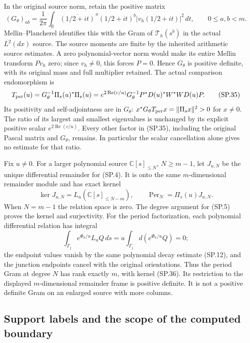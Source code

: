 In the original source norm, retain the positive matrix
\[
 (G_\theta)_{ab}
 =\frac1{2\pi}\int_{\mathbb R}
   \overline{(1/2+it)}^{\,a}(1/2+it)^b
   |v_h(1/2+it)|^2\,dt,\qquad 0\le a,b<m .
 \tag{SP.34}\label{CFStage:eq:sp-sourcegram}
\]
Mellin--Plancherel identifies this with the Gram of
\(\mathcal T_h(s^b)\) in the actual \(L^2(dx)\) source.
The source moments are finite by the inherited arithmetic
source estimates. A zero polynomial-vector norm would
make its entire Mellin transform \(Pv_h\) zero; since
\(v_h\ne0\), this forces \(P=0\).
Hence \(G_\theta\) is positive definite, with its original
mass and full multiplier retained.
The actual comparison endomorphism is
\[
 T_{\rm per}(u)=G_\theta^{-1}\Pi_s(u)^*\Pi_s(u)
 =e^{2\operatorname{Re}(c/u)}
     G_\theta^{-1}P^*D(u)^*W^*WD(u)P .
 \tag{SP.35}\label{CFStage:eq:sp-metriccomparison}
\]
Its positivity and self-adjointness are in \(G_\theta\):
\(x^*G_\theta T_{\rm per}x=\|\Pi_sx\|^2>0\) for \(x\ne0\).
The ratio of its largest and smallest eigenvalues is unchanged
by its explicit positive scalar \(e^{2\operatorname{Re}(c/u)}\).
Every other factor in (SP.35), including the original
Pascal matrix and \(G_\theta\), remains. In particular the
scalar cancellation alone gives no estimate for that ratio.

Fix \(u\ne0\). For a larger polynomial source \(\mathbb C[s]_{\le N}\),
\(N\ge m-1\), let \(J_{u,N}\) be the unique differential
remainder for (SP.4). It is onto the same \(m\)-dimensional
remainder module and has exact kernel
\[
 \ker J_{u,N}
   =L_u(\mathbb C[s]_{\le N-m}),\qquad
 \operatorname{Per}_N=\Pi_s(u)J_{u,N}.
 \tag{SP.36}\label{CFStage:eq:sp-higherkernel}
\]
When \(N=m-1\) the relation space is zero.
The degree argument for (SP.5) proves the kernel and
surjectivity. For the period factorization, each polynomial
differential relation has integral
\[
 \int_{\Gamma_j}e^{\Phi_h/u}L_uQ\,ds
 =u\int_{\Gamma_j}d(e^{\Phi_h/u}Q)=0;
 \]
the endpoint values vanish by the same polynomial decay
estimate (SP.12), and the junction endpoints cancel with
the original orientations.
Thus the period Gram at degree \(N\) has rank exactly \(m\),
with kernel (SP.36). Its restriction to the displayed
\(m\)-dimensional remainder frame is positive definite.
It is not a positive definite Gram on an enlarged source
with more columns.

\subsection{Support labels and the scope of the computed boundary}

